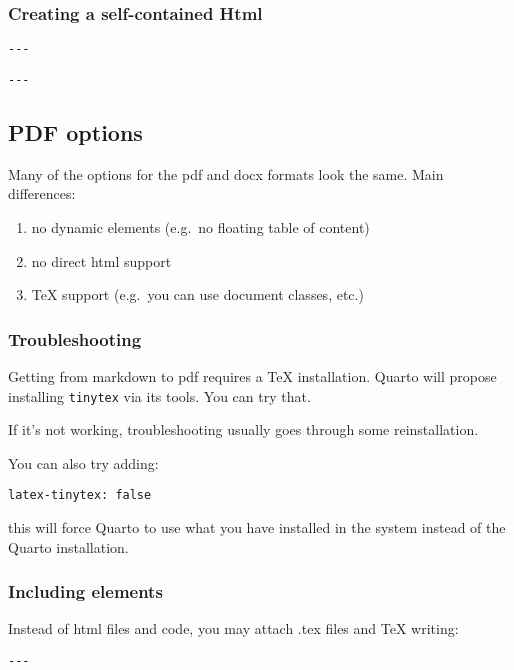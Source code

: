 \documentclass[
  letterpaper,
  DIV=11,
  numbers=noendperiod]{scrartcl}
\begin{document}
\hypertarget{creating-a-self-contained-html}{%
\subsubsection{Creating a self-contained
Html}\label{creating-a-self-contained-html}}

\texttt{-\/-\/-}

\texttt{-\/-\/-}

\hypertarget{pdf-options}{%
\subsection{PDF options}\label{pdf-options}}

Many of the options for the pdf and docx formats look the same. Main
differences:

\begin{enumerate}
\def\labelenumi{\arabic{enumi})}
\item
  no dynamic elements (e.g.~no floating table of content)
\item
  no direct html support
\item
  TeX support (e.g.~you can use document classes, etc.)
\end{enumerate}

\hypertarget{troubleshooting}{%
\subsubsection{Troubleshooting}\label{troubleshooting}}

Getting from markdown to pdf requires a TeX installation. Quarto will
propose installing \texttt{tinytex} via its tools. You can try that.

If it's not working, troubleshooting usually goes through some
reinstallation.

You can also try adding:

\texttt{latex-tinytex:\ false}

this will force Quarto to use what you have installed in the system
instead of the Quarto installation.

\hypertarget{including-elements}{%
\subsubsection{Including elements}\label{including-elements}}

Instead of html files and code, you may attach .tex files and TeX
writing:

\texttt{-\/-\/-}
\end{document}
